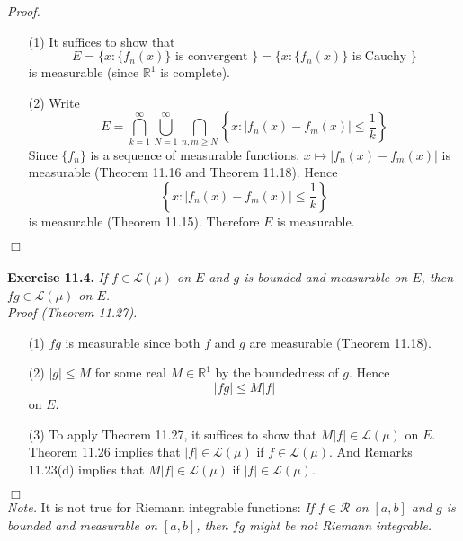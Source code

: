 \documentclass{article}
\begin{document}
\emph{Proof.}
\begin{enumerate}
\item[(1)]
  It suffices to show that
  \[
    E
    = \{ x : \{ f_n(x) \} \text{ is convergent } \}
    = \{ x : \{ f_n(x) \} \text{ is Cauchy } \}
  \]
  is measurable (since $\mathbb{R}^1$ is complete).

\item[(2)]
  Write
  \[
    E
    =
    \bigcap_{k=1}^{\infty}
    \bigcup_{N=1}^{\infty}
    \bigcap_{n,m \geq N} \left\{ x : |f_n(x)-f_m(x)| \leq \frac{1}{k} \right\}
  \]
  Since $\{f_n\}$ is a sequence of measurable functions,
  $x \mapsto |f_n(x)-f_m(x)|$ is measurable
  (Theorem 11.16 and Theorem 11.18).
  Hence
  \[
    \left\{ x : |f_n(x)-f_m(x)| \leq \frac{1}{k} \right\}
  \]
  is measurable (Theorem 11.15).
  Therefore $E$ is measurable.
\end{enumerate}
$\Box$ \\\\






\textbf{Exercise 11.4.}
\emph{If $f \in \mathscr{L}(\mu)$ on $E$ and $g$ is bounded and measurable on $E$,
then $fg \in \mathscr{L}(\mu)$ on $E$.} \\

\emph{Proof (Theorem 11.27).}
\begin{enumerate}
\item[(1)]
  $fg$ is measurable since both $f$ and $g$ are measurable (Theorem 11.18).

\item[(2)]
  $|g| \leq M$ for some real $M \in \mathbb{R}^1$ by the boundedness of $g$.
  Hence
  \[
    |fg| \leq M|f|
  \]
  on $E$.

\item[(3)]
  To apply Theorem 11.27, it suffices to show that
  $M|f| \in \mathscr{L}(\mu)$ on $E$.
  Theorem 11.26 implies that $|f| \in \mathscr{L}(\mu)$ if $f \in \mathscr{L}(\mu)$.
  And Remarks 11.23(d) implies that $M|f| \in \mathscr{L}(\mu)$ if $|f| \in \mathscr{L}(\mu)$.
\end{enumerate}
$\Box$ \\

\emph{Note.}
  It is not true for Riemann integrable functions:
  \emph{If $f \in \mathscr{R}$ on $[a,b]$ and $g$ is bounded and measurable on $[a,b]$,
  then $fg$ might be not Riemann integrable.} \\\\
\end{document}
